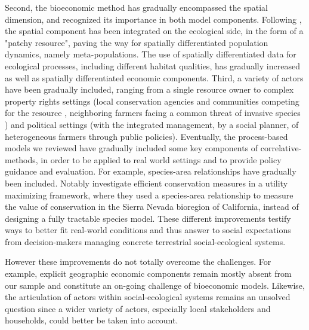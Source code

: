 Second, the bioeconomic method has gradually encompassed the spatial dimension, and recognized its importance in both model components. Following \cite{sanchirico_bioeconomics_1999}, the spatial component has been integrated on the ecological side, in the form of a "patchy resource", paving the way for spatially differentiated population dynamics, namely meta-populations. The use of spatially differentiated data for ecological processes, including different habitat qualities, has gradually increased as well as spatially differentiated economic components. 
Third, a variety of actors have been gradually included, ranging from a single resource owner to complex property rights settings (local conservation agencies and communities competing for the resource \citep{Skonhoft1998} , neighboring farmers facing a common threat of invasive species \citep{Fenichel2014}) and political settings (with the integrated management, by a social planner, of heterogeneous farmers \citep{Mouysset2014} through public policies). 
Eventually, the process-based models we reviewed have gradually included some key components of correlative-methods, in order to be applied to real world settings and to provide policy guidance and evaluation. For example, species-area relationships have gradually been included. Notably \cite{Davis2006} investigate efficient conservation measures in a utility maximizing framework, where they used a species-area relationship to measure the value of conservation in the Sierra Nevada bioregion of California, instead of designing a fully tractable species model.   
These different improvements testify ways 
to better fit real-world conditions and thus answer to social expectations from decision-makers managing concrete terrestrial social-ecological systems. 

However these improvements do not totally overcome the challenges. For example, explicit geographic economic components remain mostly absent from our sample and constitute an on-going challenge of bioeconomic models. Likewise, the articulation of actors within social-ecological systems remains an unsolved question since a wider variety of actors, especially local stakeholders and households, could better be taken into account.

